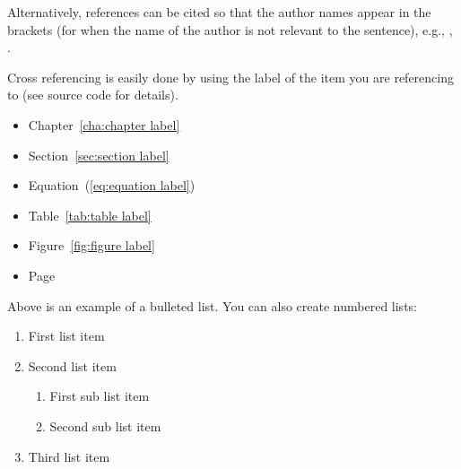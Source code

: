 Alternatively, references can be cited so that the author names appear in the brackets (for when the name of the author is not relevant to the sentence), e.g., \cite{stroud:2013},  \cite{harten:1983}.

Cross referencing is easily done by using the label of the item you are referencing to (see source code for details).
\begin{itemize}
	\item Chapter~\ref{cha:chapter label}
	\item Section~\ref{sec:section label}
	\item Equation~(\ref{eq:equation label})
	\item Table~\ref{tab:table label}
	\item Figure~\ref{fig:figure label}
	\item Page~\pageref{eq:equation label}
\end{itemize}

Above is an example of a bulleted list. You can also create numbered lists:
\begin{enumerate}
	\item First list item
	\item Second list item
	\begin{enumerate}
		\item First sub list item
		\item Second sub list item
	\end{enumerate}
	\item Third list item
\end{enumerate}
